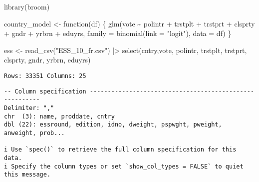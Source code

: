 \documentclass[
  letterpaper,
  DIV=11,
  numbers=noendperiod]{scrreprt}
\newenvironment{Shaded}{\begin{snugshade}}{\end{snugshade}}
\newcommand{\AttributeTok}[1]{\textcolor[rgb]{0.40,0.45,0.13}{#1}}
\newcommand{\ControlFlowTok}[1]{\textcolor[rgb]{0.00,0.23,0.31}{#1}}
\newcommand{\FunctionTok}[1]{\textcolor[rgb]{0.28,0.35,0.67}{#1}}
\newcommand{\NormalTok}[1]{\textcolor[rgb]{0.00,0.23,0.31}{#1}}
\newcommand{\OtherTok}[1]{\textcolor[rgb]{0.00,0.23,0.31}{#1}}
\newcommand{\SpecialCharTok}[1]{\textcolor[rgb]{0.37,0.37,0.37}{#1}}
\newcommand{\StringTok}[1]{\textcolor[rgb]{0.13,0.47,0.30}{#1}}
\begin{document}
\begin{Shaded}
\begin{Highlighting}[]
\FunctionTok{library}\NormalTok{(broom)}

\NormalTok{country\_model }\OtherTok{\textless{}{-}} \ControlFlowTok{function}\NormalTok{(df) \{}
  \FunctionTok{glm}\NormalTok{(vote }\SpecialCharTok{\textasciitilde{}}\NormalTok{ polintr }\SpecialCharTok{+}\NormalTok{ trstplt }\SpecialCharTok{+}\NormalTok{ trstprt }\SpecialCharTok{+}\NormalTok{ clsprty }\SpecialCharTok{+}\NormalTok{ gndr }\SpecialCharTok{+}\NormalTok{ yrbrn }\SpecialCharTok{+}\NormalTok{ eduyrs, }
      \AttributeTok{family =} \FunctionTok{binomial}\NormalTok{(}\AttributeTok{link =} \StringTok{"logit"}\NormalTok{), }\AttributeTok{data =}\NormalTok{ df)}
\NormalTok{\}}

\NormalTok{ess }\OtherTok{\textless{}{-}} \FunctionTok{read\_csv}\NormalTok{(}\StringTok{"ESS\_10\_fr.csv"}\NormalTok{) }\SpecialCharTok{|\textgreater{}} 
  \FunctionTok{select}\NormalTok{(cntry,vote, polintr, trstplt, trstprt, clsprty, gndr, yrbrn, eduyrs)}
\end{Highlighting}
\end{Shaded}

\begin{verbatim}
Rows: 33351 Columns: 25
\end{verbatim}

\begin{verbatim}
-- Column specification --------------------------------------------------------
Delimiter: ","
chr  (3): name, proddate, cntry
dbl (22): essround, edition, idno, dweight, pspwght, pweight, anweight, prob...

i Use `spec()` to retrieve the full column specification for this data.
i Specify the column types or set `show_col_types = FALSE` to quiet this message.
\end{verbatim}
\end{document}
